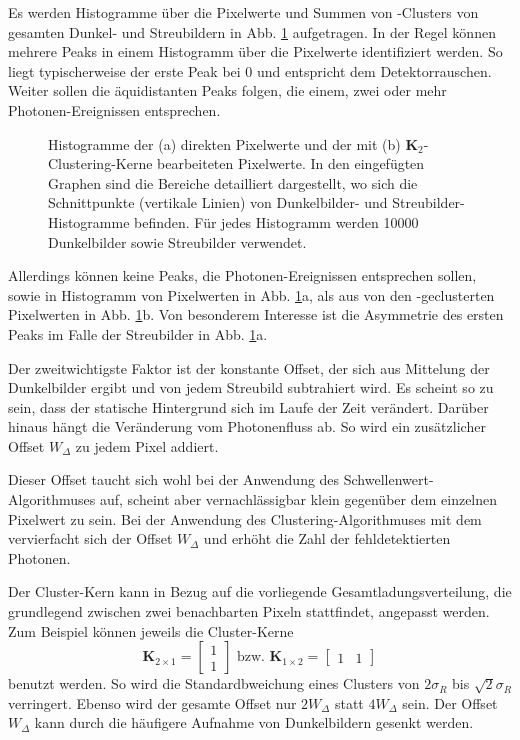 \noindent
Es werden Histogramme über die Pixelwerte und Summen von -Clusters von gesamten Dunkel- und Streubildern in Abb. \ref{fig:no_pr_cl_2_histograms} aufgetragen. In der Regel können mehrere Peaks in einem Histogramm über die Pixelwerte identifiziert werden. So liegt typischerweise der erste Peak bei \SI{0}{\adu} und entspricht dem Detektorrauschen. Weiter sollen die äquidistanten Peaks folgen, die einem, zwei oder mehr Photonen-Ereignissen entsprechen.
\begin{figure}[H]
    \centering
    
    \caption{Histogramme der (a) direkten Pixelwerte und der mit (b) $\mathbf{K}_2$-Clustering-Kerne bearbeiteten Pixelwerte. In den eingefügten Graphen sind die Bereiche detailliert dargestellt, wo sich die Schnittpunkte (vertikale Linien) von Dunkelbilder- und Streubilder-Histogramme befinden. Für jedes Histogramm werden \num{10000} Dunkelbilder sowie Streubilder verwendet.}
    \label{fig:no_pr_cl_2_histograms}
\end{figure}
\noindent
Allerdings können keine Peaks, die Photonen-Ereignissen entsprechen sollen, sowie in Histogramm von Pixelwerten in Abb. \ref{fig:no_pr_cl_2_histograms}a, als aus von den -geclusterten Pixelwerten in Abb. \ref{fig:no_pr_cl_2_histograms}b. Von besonderem Interesse ist die Asymmetrie des ersten Peaks im Falle der Streubilder in Abb. \ref{fig:no_pr_cl_2_histograms}a.

\noindent
Der zweitwichtigste Faktor ist der konstante Offset, der sich aus Mittelung der Dunkelbilder ergibt und von jedem Streubild subtrahiert wird. Es scheint so zu sein, dass der statische Hintergrund sich im Laufe der Zeit verändert. Darüber hinaus hängt die Veränderung vom Photonenfluss ab. So wird ein zusätzlicher Offset $W_\Delta$ zu jedem Pixel addiert.

\noindent
Dieser Offset taucht sich wohl bei der Anwendung des Schwellenwert-Algorithmuses auf, scheint aber vernachlässigbar klein gegenüber dem einzelnen Pixelwert zu sein. Bei der Anwendung des Clustering-Algorithmuses mit dem  vervierfacht sich der Offset $W_\Delta$ und erhöht die Zahl der fehldetektierten Photonen.

\noindent
Der Cluster-Kern kann in Bezug auf die vorliegende Gesamtladungsverteilung, die grundlegend zwischen zwei benachbarten Pixeln stattfindet, angepasst werden. Zum Beispiel können jeweils die Cluster-Kerne
\begin{equation}
    \mathbf{K}_{2\times1} = \begin{bmatrix}
1\\
1
\end{bmatrix}
\text{ bzw. }
    \mathbf{K}_{1\times2} = \begin{bmatrix}
1 & 1
\end{bmatrix}
\end{equation}
benutzt werden. So wird die Standardbweichung eines Clusters von $2\sigma_R$ bis $\sqrt{2}\sigma_R$ verringert. Ebenso wird der gesamte Offset nur $2W_\Delta$ statt $4W_\Delta$ sein. Der Offset $W_\Delta$ kann durch die häufigere Aufnahme von Dunkelbildern gesenkt werden.